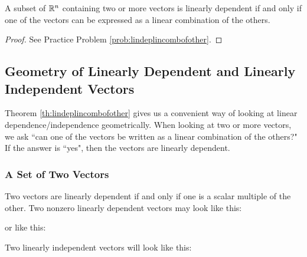 \documentclass{ximera}
\begin{document}
\begin{theorem}\label{th:lindeplincombofother}
A subset of $\mathbb{R}^n$ containing two or more vectors is linearly dependent if and only if one of the vectors can be expressed as a linear combination of the others.
\end{theorem}
\begin{proof}
See Practice Problem \ref{prob:lindeplincombofother}.
\end{proof}

\subsection*{Geometry of Linearly Dependent and Linearly Independent Vectors}

Theorem \ref{th:lindeplincombofother} gives us a convenient way of looking at linear dependence/independence geometrically.  When looking at two or more vectors, we ask ``can one of the vectors be written as a linear combination of the others?"  If the answer is ``yes", then the vectors are linearly dependent.
\subsubsection*{A Set of Two Vectors}
Two vectors are linearly dependent if and only if one is a scalar multiple of the other.  Two nonzero linearly dependent vectors may look like this:
\begin{center}
\end{center}
or like this:
\begin{center}
\end{center}
Two linearly independent vectors will look like this:
\begin{center}
\end{center}
\end{document}

